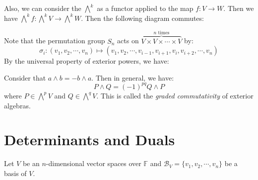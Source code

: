 \documentclass[
	11pt, %
	fleqn, %
	a4paper, %
]{LegrandOrangeBook}
\newcommand{\F}{\mathbb{F}} %
\newcommand{\B}{\mathcal{B}} %
\begin{document}
Also, we can consider the ${\bigwedge}^k$ as a functor applied to the map $f : V \to W$. Then we have ${\bigwedge}^k f : {\bigwedge}^k V \to {\bigwedge}^k W$. Then the following diagram commutes:
\begin{center}
\end{center}

Note that the permutation group $S_n$ acts on $\overbrace{V \times V \times \cdots \times V}^{n \text{ times}}$ by:
\[
    \sigma_i : (v_1, v_2, \cdots, v_n) \mapsto (v_1, v_2, \cdots, v_{i - 1}, v_{i + 1}, v_i, v_{i + 2}, \cdots, v_n)
\]
By the universal property of exterior powers, we have:
\begin{center}
\end{center}

Consider that $a \wedge b = - b \wedge a$. Then in general, we have:
\[
    P \wedge Q = (-1)^{pq} Q \wedge P
\]
where $P \in {\bigwedge}^p V$ and $Q \in {\bigwedge}^q V$. This is called the \emph{graded commutativity} of exterior algebras.

\newpage

\section{Determinants and Duals}

Let $V$ be an $n$-dimensional vector spaces over $\F$ and $\B_V = \{ v_1, v_2, \cdots, v_n \}$ be a basis of $V$. 
\end{document}

